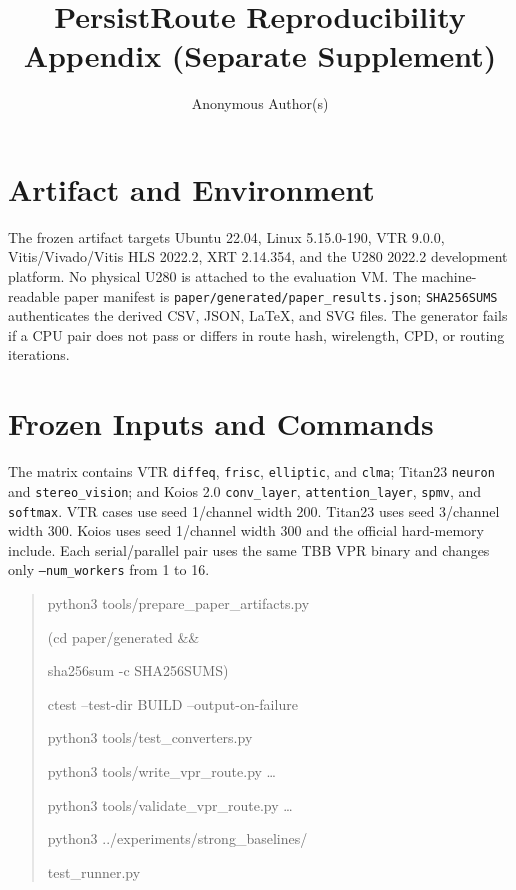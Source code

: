 \documentclass[sigconf,anonymous]{acmart}
\begin{document}
\title{PersistRoute Reproducibility Appendix (Separate Supplement)}
\author{Anonymous Author(s)}
\maketitle

\section{Artifact and Environment}

The frozen artifact targets Ubuntu 22.04, Linux 5.15.0-190, VTR 9.0.0,
Vitis/Vivado/Vitis HLS 2022.2, XRT 2.14.354, and the U280 2022.2 development
platform. No physical U280
is attached to the evaluation VM. The machine-readable paper manifest is
\texttt{paper/generated/}\allowbreak\texttt{paper\_results.json};
\texttt{SHA256SUMS} authenticates
the derived CSV, JSON, LaTeX, and SVG files. The generator fails if a CPU pair
does not pass or differs in route hash, wirelength, CPD, or routing iterations.

\section{Frozen Inputs and Commands}

The matrix contains VTR \texttt{diffeq}, \texttt{frisc}, \texttt{elliptic}, and
\texttt{clma}; Titan23 \texttt{neuron} and \texttt{stereo\_vision}; and Koios
2.0 \texttt{conv\_layer}, \texttt{attention\_layer}, \texttt{spmv}, and
\texttt{softmax}. VTR cases use seed 1/channel width 200. Titan23 uses seed
3/channel width 300. Koios uses seed 1/channel width 300 and the official
hard-memory include. Each serial/parallel pair uses the same TBB VPR binary and
changes only \texttt{--num\_workers} from 1 to 16.

\begin{quote}\ttfamily\small
python3 tools/prepare\_paper\_artifacts.py\par
(cd paper/generated \&\&\par
\quad sha256sum -c SHA256SUMS)\par
ctest --test-dir BUILD --output-on-failure\par
python3 tools/test\_converters.py\par
python3 tools/write\_vpr\_route.py \ldots\par
python3 tools/validate\_vpr\_route.py \ldots\par
python3 ../experiments/strong\_baselines/\par
\quad test\_runner.py
\end{quote}
\end{document}
